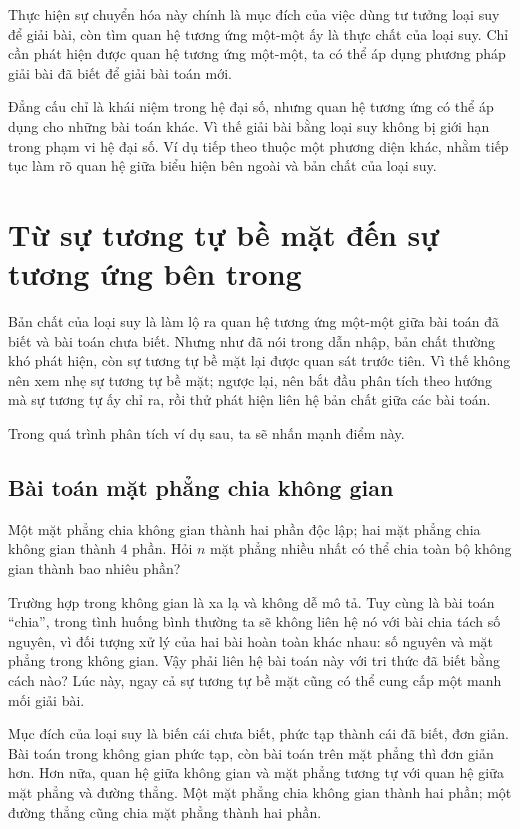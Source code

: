 \documentclass[11pt]{article}
\begin{document}
Thực hiện sự chuyển hóa này chính là mục đích của việc dùng tư tưởng loại suy
để giải bài, còn tìm quan hệ tương ứng một-một ấy là thực chất của loại suy.
Chỉ cần phát hiện được quan hệ tương ứng một-một, ta có thể áp dụng phương
pháp giải bài đã biết để giải bài toán mới.

Đẳng cấu chỉ là khái niệm trong hệ đại số, nhưng quan hệ tương ứng có thể áp
dụng cho những bài toán khác. Vì thế giải bài bằng loại suy không bị giới hạn
trong phạm vi hệ đại số. Ví dụ tiếp theo thuộc một phương diện khác, nhằm
tiếp tục làm rõ quan hệ giữa biểu hiện bên ngoài và bản chất của loại suy.

\section{Từ sự tương tự bề mặt đến sự tương ứng bên trong}

Bản chất của loại suy là làm lộ ra quan hệ tương ứng một-một giữa bài toán đã
biết và bài toán chưa biết. Nhưng như đã nói trong dẫn nhập, bản chất thường
khó phát hiện, còn sự tương tự bề mặt lại được quan sát trước tiên. Vì thế
không nên xem nhẹ sự tương tự bề mặt; ngược lại, nên bắt đầu phân tích theo
hướng mà sự tương tự ấy chỉ ra, rồi thử phát hiện liên hệ bản chất giữa các
bài toán.

Trong quá trình phân tích ví dụ sau, ta sẽ nhấn mạnh điểm này.

\subsection*{Bài toán mặt phẳng chia không gian}

Một mặt phẳng chia không gian thành hai phần độc lập; hai mặt phẳng chia không
gian thành \(4\) phần. Hỏi \(n\) mặt phẳng nhiều nhất có thể chia toàn bộ
không gian thành bao nhiêu phần?~\cite{polya}

Trường hợp trong không gian là xa lạ và không dễ mô tả. Tuy cùng là bài toán
``chia'', trong tình huống bình thường ta sẽ không liên hệ nó với bài chia
tách số nguyên, vì đối tượng xử lý của hai bài hoàn toàn khác nhau: số nguyên
và mặt phẳng trong không gian. Vậy phải liên hệ bài toán này với tri thức đã
biết bằng cách nào? Lúc này, ngay cả sự tương tự bề mặt cũng có thể cung cấp
một manh mối giải bài.

Mục đích của loại suy là biến cái chưa biết, phức tạp thành cái đã biết, đơn
giản. Bài toán trong không gian phức tạp, còn bài toán trên mặt phẳng thì đơn
giản hơn. Hơn nữa, quan hệ giữa không gian và mặt phẳng tương tự với quan hệ
giữa mặt phẳng và đường thẳng. Một mặt phẳng chia không gian thành hai phần;
một đường thẳng cũng chia mặt phẳng thành hai phần.
\end{document}
